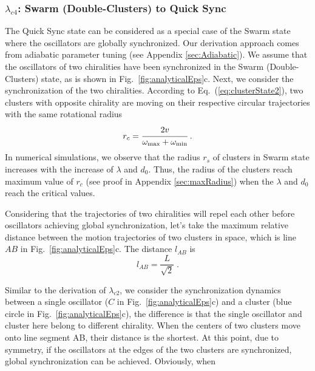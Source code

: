 \documentclass[%
 aip,
 amsmath,amssymb,
 reprint,%
]{revtex4-1}
\begin{document}
\subsubsection{$\lambda_{c4}$: Swarm (Double-Clusters) to Quick Sync}
The Quick Sync state can be considered as a special case of the Swarm state where the oscillators are globally synchronized. Our derivation approach comes from adiabatic parameter tuning (see Appendix \ref{sec:Adiabatic}). We assume that the oscillators of two chiralities have been synchronized in the Swarm (Double-Clusters) state, as is shown in Fig.~\ref{fig:analyticalEps}c. Next, we consider the synchronization of the two chiralities. According to Eq.~(\ref{eq:clusterState2}), two clusters with opposite chirality are moving on their respective circular trajectories with the same rotational radius
\begin{equation}
    r_c = \cfrac{2v}{\omega_{\max}+\omega_{\min}}\;.
\end{equation}
In numerical simulations, we observe that the radius $r_s$ of clusters in Swarm state increases with the increase of $\lambda$ and $d_0$. Thus, the radius of the clusters reach maximum value of $r_c$ (see proof in Appendix \ref{sec:maxRadius}) when the $\lambda$ and $d_0$ reach the critical values.

Considering that the trajectories of two chiralities will repel each other before oscillators achieving global synchronization, let's take the maximum relative distance between the motion trajectories of two clusters in space, which is line $AB$ in Fig.~\ref{fig:analyticalEps}c. The distance $l_{AB}$ is
\begin{equation}
    l_{AB}=\frac{L}{\sqrt{2}}\;.
\end{equation}

Similar to the derivation of $\lambda_{c2}$, we consider the synchronization dynamics between a single oscillator ($C$ in Fig.~\ref{fig:analyticalEps}c) and a cluster (blue circle in Fig.~\ref{fig:analyticalEps}c), the difference is that the single oscillator and cluster here belong to different chirality. When the centers of two clusters move onto line segment AB, their distance is the shortest. At this point, due to symmetry, if the oscillators at the edges of the two clusters are synchronized, global synchronization can be achieved. Obviously, when 
\end{document}
